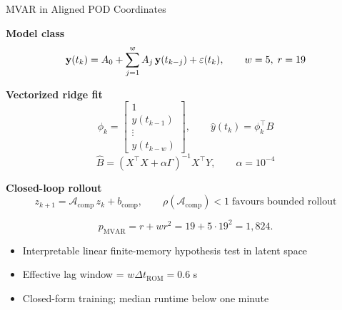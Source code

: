
\iffalse
\begin{frame}[shrink=8]{MVAR in Aligned POD Coordinates}
\footnotesize

\textbf{Model class}
\[
  \mathbf{y}(t_k)
  =
  A_0+\sum_{j=1}^{w}A_j\,\mathbf{y}(t_{k-j})+\varepsilon(t_k),
  \qquad
  w=5,\; r=19
\]

\textbf{Vectorized ridge fit}
\[
  \phi_k
  =
  \begin{bmatrix}
    1\\[2pt]
    y(t_{k-1})\\
    \vdots\\
    y(t_{k-w})
  \end{bmatrix},
  \qquad
  \hat y(t_k)=\phi_k^\top B
\]
\[
  \hat B
  =
  (X^\top X+\alpha\Gamma)^{-1}X^\top Y,
  \qquad
  \alpha=10^{-4}
\]

\textbf{Closed-loop rollout}
\[
  z_{k+1}
  =
  \mathcal{A}_{\mathrm{comp}}\,z_k+b_{\mathrm{comp}},
  \qquad
  \rho(\mathcal{A}_{\mathrm{comp}})<1
  \;\text{favours bounded rollout}
\]

\[
  p_{\mathrm{MVAR}}
  =
  r+w r^2
  =
  19 + 5\cdot 19^2
  =
  1{,}824.
\]

\begin{itemize}
  \item Interpretable linear finite-memory hypothesis test in latent space
  \item Effective lag window = $w\Delta t_{\mathrm{ROM}} = 0.6$ s
  \item Closed-form training; median runtime below one minute
\end{itemize}
\end{frame}

